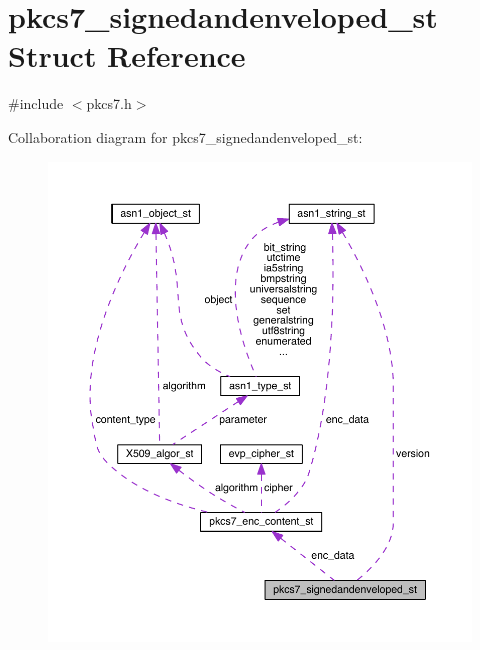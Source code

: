 \hypertarget{structpkcs7__signedandenveloped__st}{}\section{pkcs7\+\_\+signedandenveloped\+\_\+st Struct Reference}
\label{structpkcs7__signedandenveloped__st}


{\ttfamily \#include $<$pkcs7.\+h$>$}



Collaboration diagram for pkcs7\+\_\+signedandenveloped\+\_\+st\+:\nopagebreak
\begin{figure}[H]
\begin{center}
\leavevmode
\includegraphics[width=350pt]{structpkcs7__signedandenveloped__st__coll__graph}
\end{center}
\end{figure}
